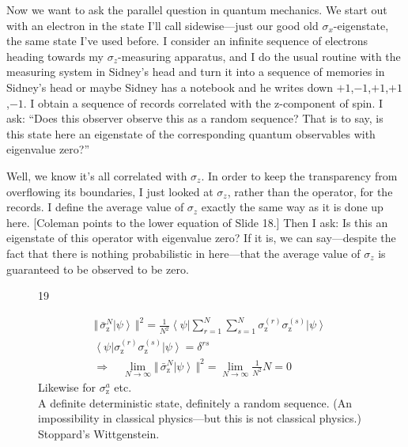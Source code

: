 \documentclass[twocolumn,prb]{revtex4}
\newcommand{\bra}[1]{\left\langle#1\right|}
\newcommand{\ket}[1]{\left|#1\right\rangle}
\newcommand{\bignorm}[1]{\bigl\Vert #1\bigr\Vert}
\newcommand{\z}{\text{z}}
\begin{document}
Now we want to ask the parallel question in quantum mechanics. We start out with an electron in the state I'll call sidewise---just our good old $\sigma_x$-eigenstate, the same state I've used before. I consider an infinite sequence of electrons heading towards my $\sigma_z$-measuring apparatus, and I do the usual routine with the measuring system in Sidney's head and turn it into a sequence of memories in Sidney's head or maybe Sidney has a notebook and he writes down $+1$,$-1$,$+1$,$+1$,$-1$. I obtain a sequence of records correlated with the z-component of spin. I ask: ``Does this observer observe this as a random sequence? That is to say, is this state here an eigenstate of the corresponding quantum observables with eigenvalue zero?''

Well, we know it's all correlated with $\sigma_z$. In order to keep the transparency from overflowing its boundaries, I just looked at $\sigma_z$, rather than the operator, for the records. I define the average value
of $\sigma_z$ exactly the same way as it is done up here.  [Coleman points to the lower equation of Slide 18.]  Then I ask:  
Is this an eigenstate of this operator with eigenvalue zero? If it is, we can say---despite the fact that there is nothing probabilistic in here---that the average value of $\sigma_z$ is guaranteed to be observed to be zero.

\begin{figure}[htb] 
\begin{mdframed}
  \vspace{5pt}\hfill 19\\[-18pt]
  \begin{raggedright}
  \begin{align}\nonumber
    &\bignorm{\,\bar\sigma_\z^N\ket{\psi}\, }^2
      =\frac{1}{N^2}\bra{\psi}
      \sum_{r=1}^N \sum_{s=1}^N\sigma_\z^{(r)}\sigma_\z^{(s)}\ket{\psi}
    \\[3pt]\nonumber
    &%
      \bra{\psi}\sigma_\z^{(r)}\sigma_\z^{(s)}\ket{\psi}=\delta^{rs}
    \\[6pt]\nonumber
    &\Rightarrow\quad
    \lim_{N\to\infty}\bignorm{\,\bar\sigma_\z^N\ket{\psi}\, }^2
    =\lim_{N\to\infty}\frac{1}{N^2} N =0
  \end{align}
  Likewise for $\sigma_\z^a$ etc. \\[0.5\baselineskip]

  A definite deterministic state, definitely a random sequence.
  (An impossibility in classical physics---but this is not classical physics.)\\[\baselineskip]

  Stoppard's Wittgenstein.
  \end{raggedright}
\vspace{.5\baselineskip}
\end{mdframed}
\end{figure}
\end{document}
